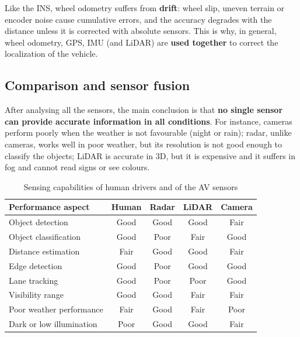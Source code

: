 \vspace{6pt}Like the INS, wheel odometry suffers from \textbf{drift}: wheel slip, uneven terrain or encoder noise cause cumulative errors, and the accuracy degrades with the distance unless it is corrected with absolute sensors.
This is why, in general, wheel odometry, GPS, IMU (and LiDAR) are \textbf{used together} to correct the localization of the vehicle.

\subsection{Comparison and sensor fusion}
After analysing all the sensors, the main conclusion is that \textbf{no single sensor can provide accurate information in all conditions}.
For instance, cameras perform poorly when the weather is not favourable (night or rain); radar, unlike cameras, works well in poor weather, but its resolution is not good enough to classify the objects; LiDAR is accurate in 3D, but it is expensive and it suffers in fog and cannot read signs or see colours.

\begin{table}[H]
    \centering
    \begin{tabular}{|l|c|c|c|c|}
        \hline
        \textbf{Performance aspect} & \textbf{Human} & \textbf{Radar} & \textbf{LiDAR} & \textbf{Camera} \\
        \hline
        Object detection              & Good & Good & Good & Fair \\
        \hline
        Object classification         & Good & Poor & Fair & Good \\
        \hline
        Distance estimation           & Fair & Good & Good & Fair \\
        \hline
        Edge detection                & Good & Poor & Good & Good \\
        \hline
        Lane tracking                 & Good & Poor & Poor & Good \\
        \hline
        Visibility range              & Good & Good & Fair & Fair \\
        \hline
        Poor weather performance      & Fair & Good & Fair & Poor \\
        \hline
        Dark or low illumination      & Poor & Good & Good & Fair \\
        \hline
    \end{tabular}
    \caption{Sensing capabilities of human drivers and of the AV sensors}
\end{table}


